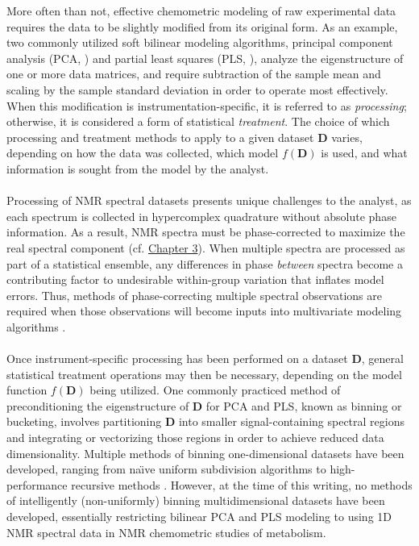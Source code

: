 \begin{doublespace}
More often than not, effective chemometric modeling of raw experimental data
requires the data to be slightly modified from its original form. As an
example, two commonly utilized soft bilinear modeling algorithms, principal
component analysis (PCA, \cite{jolliffe2002}) and partial least squares
(PLS, \cite{wold1993}), analyze the eigenstructure of one or more data
matrices, and require subtraction of the sample mean and scaling by the sample
standard deviation in order to operate most effectively. When this modification
is instrumentation-specific, it is referred to as {\it processing}; otherwise,
it is considered a form of statistical {\it treatment}. The choice of which
processing and treatment methods to apply to a given dataset $\mathbf{D}$
varies, depending on how the data was collected, which model $f(\mathbf{D})$
is used, and what information is sought from the model by the analyst.
\\\\
Processing of NMR spectral datasets presents unique challenges to the analyst,
as each spectrum is collected in hypercomplex quadrature
\cite{schuyler:jmr2013} without absolute phase information. As a result,
NMR spectra must be phase-corrected to maximize the real spectral component
(cf. \hyperlink{chapter.3}{Chapter 3}). When multiple spectra are processed as
part of a statistical ensemble, any differences in phase {\it between} spectra
become a contributing factor to undesirable within-group variation that
inflates model errors. Thus, methods of phase-correcting multiple spectral
observations are required when those observations will become inputs into
multivariate modeling algorithms \cite{worley:cils2014}.
\\\\
Once instrument-specific processing has been performed on a dataset
$\mathbf{D}$, general statistical treatment operations may then be necessary,
depending on the model function $f(\mathbf{D})$ being utilized. One commonly
practiced method of preconditioning the eigenstructure of $\mathbf{D}$ for
PCA and PLS, known as binning or bucketing, involves partitioning $\mathbf{D}$
into smaller signal-containing spectral regions and integrating or vectorizing
those regions in order to achieve reduced data dimensionality. Multiple methods
of binning one-dimensional datasets have been developed, ranging from
na\"{\i}ve uniform subdivision algorithms
\cite{hedenstrom:cils2008,sousa:cils2013} to high-performance recursive
methods \cite{davis:cils2007,demeyer:anchem2008}. However, at the time
of this writing, no methods of intelligently (non-uniformly) binning
multidimensional datasets have been developed, essentially restricting bilinear
PCA and PLS modeling to using 1D \hnmr NMR spectral data in NMR chemometric
studies of metabolism.
\end{doublespace}

